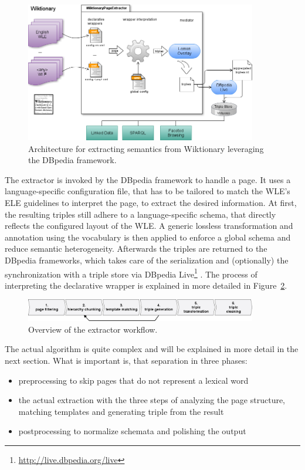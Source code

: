 \begin{figure}[tb]
\centering
\includegraphics[width=0.9\textwidth]{./images/architecture.png}
\caption{Architecture for extracting semantics from Wiktionary leveraging the DBpedia framework.}
\label{fig:architecture}
\end{figure}
The \wik extractor is invoked by the DBpedia framework to handle a page.
It uses a language-specific configuration file, that has to be tailored to match the WLE's ELE guidelines to interpret the page, to extract the desired information. 
At first, the resulting triples still adhere to a language-specific schema, that directly reflects the configured layout of the WLE. 
A generic lossless transformation and annotation using the \lemon vocabulary is then applied to enforce a global schema and reduce semantic heterogeneity. 
Afterwards the triples are returned to the DBpedia frameworks, which takes care of the serialization and (optionally) the synchronization with a triple store via DBpedia Live\footnote{\url{http://live.dbpedia.org/live}} \cite{dbpedia_live_2012}.
The process of interpreting the declarative wrapper is explained in more detailed in Figure~\ref{fig:extractor}.

\begin{figure}[tb]
\centering
\includegraphics[width=0.9\textwidth]{./images/extractor.png}
\caption{Overview of the extractor workflow.}
\label{fig:extractor}
\end{figure}

The actual algorithm is quite complex and will be explained in more detail in the next section. What is important is, that separation in three phases: 
\begin{itemize}
\item preprocessing to skip pages that do not represent a lexical word
\item the actual extraction with the three steps of analyzing the page structure, matching templates and generating triple from the result
\item postprocessing to normalize schemata and polishing the output
\end{itemize}

